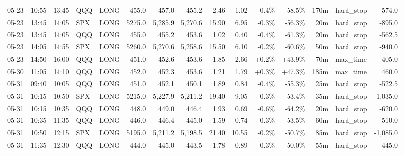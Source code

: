 \documentclass[11pt,a4paper,twoside]{article}
\begin{document}
\begin{landscape}
\begin{center}
\begin{longtable}{>{\color{txtmain}}l l l l l r r r r r r r r >{\color{txtmain}}l r}
05-23 & 10:55 & 13:45 & QQQ & LONG & 455.0 & 457.0 & 455.2 & 2.46 & 1.02 & \textcolor{lossred}{-0.4\%} & \textcolor{lossred}{-58.5\%} & 170m & hard\_stop & \textcolor{lossred}{-574.0} \\
05-23 & 13:45 & 14:05 & SPX & LONG & 5275.0 & 5,285.9 & 5,270.6 & 15.90 & 6.95 & \textcolor{lossred}{-0.3\%} & \textcolor{lossred}{-56.3\%} & 20m & hard\_stop & \textcolor{lossred}{-895.0} \\
05-23 & 13:45 & 14:05 & QQQ & LONG & 455.0 & 455.2 & 453.6 & 1.02 & 0.40 & \textcolor{lossred}{-0.4\%} & \textcolor{lossred}{-61.3\%} & 20m & hard\_stop & \textcolor{lossred}{-562.5} \\
05-23 & 14:05 & 14:55 & SPX & LONG & 5260.0 & 5,270.6 & 5,258.6 & 15.50 & 6.10 & \textcolor{lossred}{-0.2\%} & \textcolor{lossred}{-60.6\%} & 50m & hard\_stop & \textcolor{lossred}{-940.0} \\
05-23 & 14:50 & 16:00 & QQQ & LONG & 451.0 & 452.6 & 453.6 & 1.85 & 2.66 & \textcolor{wingreen}{+0.2\%} & \textcolor{wingreen}{+43.9\%} & 70m & max\_time & \textcolor{wingreen}{405.0} \\
05-30 & 11:05 & 14:10 & QQQ & LONG & 452.0 & 452.3 & 453.6 & 1.21 & 1.79 & \textcolor{wingreen}{+0.3\%} & \textcolor{wingreen}{+47.3\%} & 185m & max\_time & \textcolor{wingreen}{460.0} \\
05-31 & 09:40 & 10:05 & QQQ & LONG & 451.0 & 452.1 & 450.1 & 1.89 & 0.84 & \textcolor{lossred}{-0.4\%} & \textcolor{lossred}{-55.3\%} & 25m & hard\_stop & \textcolor{lossred}{-522.5} \\
05-31 & 10:15 & 10:50 & SPX & LONG & 5215.0 & 5,227.9 & 5,211.2 & 19.40 & 9.05 & \textcolor{lossred}{-0.3\%} & \textcolor{lossred}{-53.4\%} & 35m & hard\_stop & \textcolor{lossred}{-1,035.0} \\
05-31 & 10:15 & 10:35 & QQQ & LONG & 448.0 & 449.0 & 446.4 & 1.93 & 0.69 & \textcolor{lossred}{-0.6\%} & \textcolor{lossred}{-64.2\%} & 20m & hard\_stop & \textcolor{lossred}{-620.0} \\
05-31 & 10:35 & 11:35 & QQQ & LONG & 446.0 & 446.4 & 445.0 & 1.59 & 0.74 & \textcolor{lossred}{-0.3\%} & \textcolor{lossred}{-53.5\%} & 60m & hard\_stop & \textcolor{lossred}{-510.0} \\
05-31 & 10:50 & 12:15 & SPX & LONG & 5195.0 & 5,211.2 & 5,198.5 & 21.40 & 10.55 & \textcolor{lossred}{-0.2\%} & \textcolor{lossred}{-50.7\%} & 85m & hard\_stop & \textcolor{lossred}{-1,085.0} \\
05-31 & 11:35 & 12:30 & QQQ & LONG & 444.0 & 445.0 & 443.5 & 1.78 & 0.89 & \textcolor{lossred}{-0.3\%} & \textcolor{lossred}{-50.0\%} & 55m & hard\_stop & \textcolor{lossred}{-445.0} \\

\end{longtable}
\end{center}
\end{landscape}
\end{document}
